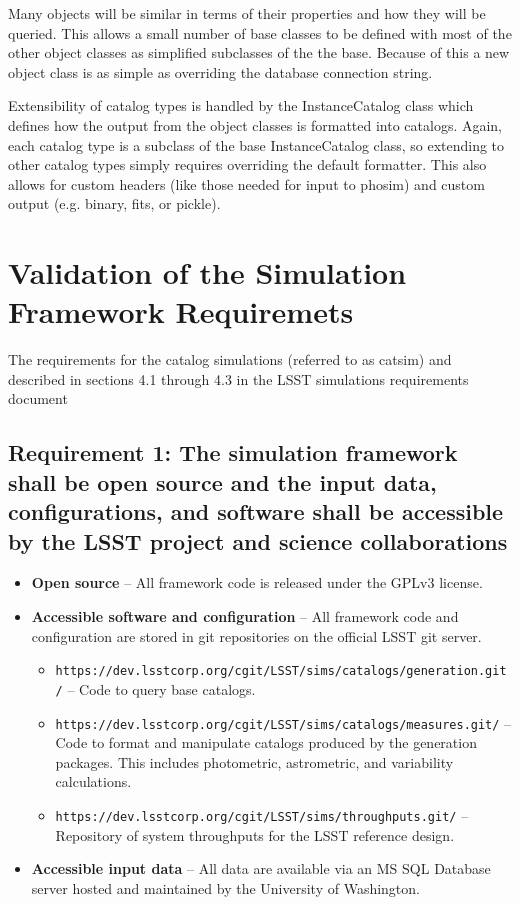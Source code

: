 \documentclass[]{article}
\begin{document}
{Many objects will be similar in terms of their properties and how they will be queried.
This allows a small number of base classes to be defined with most of the other object
classes as simplified subclasses of the the base.
Because of this a new object class is as simple as overriding the database connection string.

Extensibility of catalog types is handled by the InstanceCatalog class which defines how
the output from the object classes is formatted into catalogs.  Again, each catalog
type is a subclass of the base InstanceCatalog class, so extending to other catalog
types simply requires overriding the default formatter.  This also allows for custom headers
(like those needed for input to phosim) and custom output (e.g. binary, fits, or pickle).

\section{Validation of the Simulation Framework Requiremets}
The requirements for the catalog simulations (referred to as catsim) and described in sections
4.1 through 4.3 in the LSST simulations requirements document \citep{requirements}

\subsection{Requirement 1: The simulation framework shall be open source and the input data, configurations,
and software shall be accessible by the LSST project and science collaborations}
\begin{itemize}
\item {\bf Open source} -- All framework code is released under the GPLv3 license.
\item {\bf Accessible software and configuration} -- All framework code and configuration are 
stored in git repositories on the official LSST git server.
\begin{itemize}
\item {\tt https://dev.lsstcorp.org/cgit/LSST/sims/catalogs/generation.git/} -- Code to query
base catalogs.
\item {\tt https://dev.lsstcorp.org/cgit/LSST/sims/catalogs/measures.git/} -- Code to format
and manipulate catalogs produced by the generation packages.  This includes photometric, 
astrometric, and variability calculations.
\item {\tt https://dev.lsstcorp.org/cgit/LSST/sims/throughputs.git/} -- Repository
of system throughputs for the LSST reference design.
\end{itemize}
\item {\bf Accessible input data} -- All data are available via an MS SQL Database server
hosted and maintained by the University of Washington.
\end{itemize}

}
\end{document}
